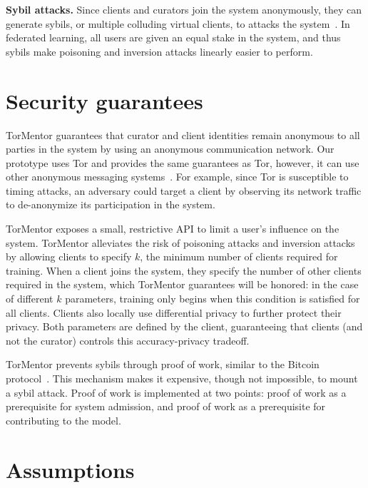\noindent \textbf{Sybil attacks.}  Since clients and curators join the
system anonymously, they can generate sybils, or multiple colluding
virtual clients, to attacks the system~\cite{Douceur:2002}. In
federated learning, all users are given an equal stake in the system,
and thus sybils make poisoning and inversion attacks linearly easier
to perform.

\section{Security guarantees} 

TorMentor guarantees that curator and client identities remain
anonymous to all parties in the system by using an anonymous
communication network. Our prototype uses Tor and provides the same
guarantees as Tor, however, it can use other anonymous
messaging systems~\cite{Vuvuzela:2015, Riposte:2015}. For example, since
Tor is susceptible to timing attacks, an adversary could target a
client by observing its network traffic to de-anonymize its
participation in the system. 

TorMentor exposes a small, restrictive API to limit a user's influence
on the system. TorMentor alleviates the risk of poisoning attacks and
inversion attacks by allowing clients to specify $k$, the minimum
number of clients required for training. When a client joins the
system, they specify the number of other clients required in the
system, which TorMentor guarantees will be honored: in the
case of different $k$ parameters, training only begins when this
condition is satisfied for all clients. Clients also locally use
differential privacy to further protect their privacy. Both parameters
are defined by the client, guaranteeing that clients (and not the
curator) controls this accuracy-privacy tradeoff.


TorMentor prevents sybils through proof of work, similar to the Bitcoin
protocol~\cite{Nakamoto:2009}. This mechanism makes it expensive,
though not impossible, to mount a sybil attack. Proof of work is
implemented at two points: proof of work as a prerequisite for system
admission, and proof of work as a prerequisite for contributing to the
model.

\section{Assumptions}

